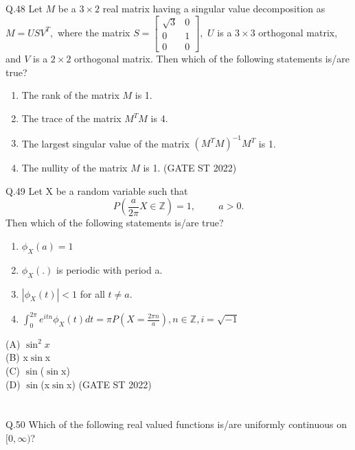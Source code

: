 \documentclass[journal,12pt,onecolumn]{IEEEtran}
\theoremstyle{remark}
\begin{document}
	\vspace{2em}
Q.48 Let \(M\) be a \(3 \times 2\) real matrix having a singular value decomposition as $M = USV^T,$ where the matrix $
S = \begin{bmatrix}
	\sqrt{3} & 0 \\
	0 & 1 \\
	0 & 0
\end{bmatrix},
$
\(U\) is a \(3 \times 3\) orthogonal matrix, and \(V\) is a \(2 \times 2\) orthogonal matrix. Then which of the following statements is/are true?
\begin{enumerate}[label=\Alph*.] 
	\item The rank of the matrix \(M\) is 1.
	\item The trace of the matrix \(M^TM\) is 4.
	\item The largest singular value of the matrix \((M^TM)^{-1}M^T\) is 1.
	\item The nullity of the matrix \(M\) is 1.
	\hfill (GATE ST 2022)
\end{enumerate}
	\vspace{2em}
Q.49 Let X be a random variable such that 
\[
P\left(\frac{a}{2\pi}X \in \mathbb{Z}\right) = 1, \hspace{1cm} a > 0.
\]
Then which of the following statements is/are true?
\begin{enumerate}[label=\Alph*.] 
	\item $\phi_X(a) = 1$
	\item $\phi_X(.)$ is periodic with period a.
	\item $|\phi_X(t)| < 1$ for all $t \neq a$.
	\item $\int_{0}^{2\pi} e^{itn} \phi_X(t) dt = \pi P\left(X = \frac{2\pi n}{a}\right), n \in \mathbb{Z}, i = \sqrt{-1}$
\end{enumerate}(A) $\sin^2x$\\
(B) x$\sin$x\\
(C) $\sin$($\sin$x)\\
(D) $\sin$(x$\sin$x) \hfill (GATE ST 2022)\\
\\
\\
Q.50 Which of the following real valued functions is/are uniformly continuous on $[0, \infty)$?
\end{document}
